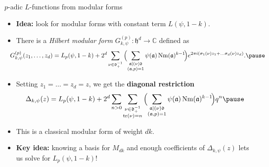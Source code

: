 \documentclass[10pt]{beamer}
\def\acts{\mathrel{\reflectbox{$\righttoleftarrow$}}}
\let\mf\mathfrak
\newcommand{\C}{\mathbb{C}}
\renewcommand{\O}{\mathcal{O}}
\DeclareMathOperator{\Nm}{Nm}
\DeclareMathOperator{\Sl}{Sl}
\begin{document}
\begin{frame}{$p$-adic $L$-functions from modular forms}
\begin{itemize}[leftmargin=-3pt]
\item \textbf{Idea:} look for modular forms with constant term $L(\psi,1-k)$.\pause
\item There is a \emph{Hilbert modular form} $G_{k,\psi}^{(p)}\colon \mf
  h^{d}\to \C$ defined as  
  \[ \hspace{-10pt}G_{k,\psi}^{(p)}(z_{1},\ldots, z_{d}) = L_{p}(\psi,1-k) + 2^{d}\sum_{\nu \in \mf
      d^{-1}_{+}}\Big(\!\sum_{\substack{\mf a \mid (\nu)\mf d \\ (\mf a, p) =
        1}}\psi(\mf a)\Nm(\mf a)^{k-1}\!\Big)e^{2\pi i (\sigma_{1}(\nu)z_{1} + \ldots
      \sigma_{d}(\nu)z_{d})}. \pause
  \]
  

\item Setting $z_{1} = \ldots = z_{d} = z$, we get the \textbf{diagonal restriction}
  \[\Delta_{k,\psi}(z) = L_{p}(\psi,1-k) + 2^{d}\sum_{n>0}\sum_{\substack{ \nu \in \mf
      d^{-1}_{+}\\ \tr(\nu) = n}}\Big(\!\sum_{\substack{\mf a \mid (\nu)\mf d \\ (\mf a, p) =
        1}}\psi(\mf a)\Nm(\mf a)^{k-1}\!\Big)q^{n}\pause
  \]
\item This is a classical modular form of weight $dk$. \pause
\item \textbf{Key idea:} knowing a basis for $M_{dk}$ and enough
   coefficients of
  $\Delta_{k,\psi}(z)$ lets us solve for $L_{p}(\psi,1-k)$!
\end{itemize}

\end{frame}
\end{document}
